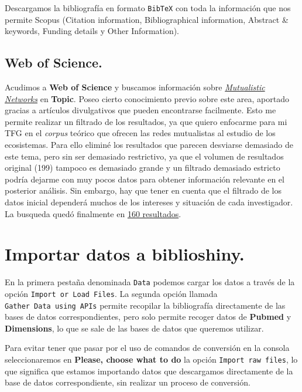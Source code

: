 \documentclass[
]{article}
\begin{document}
Descargamos la bibliografía en formato \texttt{BibTeX} con toda la
información que nos permite Scopus (Citation information,
Bibliographical information, Abstract \& keywords, Funding details y
Other Information).

\hypertarget{web-of-science.}{%
\subsection{Web of Science.}\label{web-of-science.}}

Acudimos a \textbf{Web of Science} y buscamos información sobre
\href{https://www.webofscience.com/wos/alldb/summary/965e996b-ce32-4096-b23b-3d5fc1090cd3-1b146a07/relevance/1}{\emph{Mutualistic
Networks}} en \textbf{Topic}. Poseo cierto conocimiento previo sobre
este area, aportado gracias a artículos divulgativos que pueden
encontrarse facilmente. Esto me permite realizar un filtrado de los
resultados, ya que quiero enfocarme para mi TFG en el \emph{corpus}
teórico que ofrecen las redes mutualistas al estudio de los ecosistemas.
Para ello eliminé los resultados que parecen desviarse demasiado de este
tema, pero sin ser demasiado restrictivo, ya que el volumen de
resultados original (199) tampoco es demasiado grande y un filtrado
demasiado estricto podría dejarme con muy pocos datos para obtener
información relevante en el posterior análisis. Sin embargo, hay que
tener en cuenta que el filtrado de los datos inicial dependerá muchos de
los intereses y situación de cada investigador. La busqueda quedó
finalmente en
\href{https://www.webofscience.com/wos/alldb/summary/96d9e399-8558-49a7-bcc4-23b8a83d4a6e-1b14ad06/relevance/1}{160
resultados}.

\hypertarget{importar-datos-a-biblioshiny.}{%
\section{Importar datos a
biblioshiny.}\label{importar-datos-a-biblioshiny.}}

En la primera pestaña denominada \texttt{Data} podemos cargar los datos
a través de la opción \texttt{Import\ or\ Load\ Files}. La segunda
opción llamada \texttt{Gather\ Data\ using\ APIs} permite recopilar la
bibliografía directamente de las bases de datos correspondientes, pero
solo permite recoger datos de \textbf{Pubmed} y \textbf{Dimensions}, lo
que se sale de las bases de datos que queremos utilizar.

Para evitar tener que pasar por el uso de comandos de conversión en la
consola seleccionaremos en \textbf{Please, choose what to do} la opción
\texttt{Import\ raw\ files}, lo que significa que estamos importando
datos que descargamos directamente de la base de datos correspondiente,
sin realizar un proceso de conversión.
\end{document}
